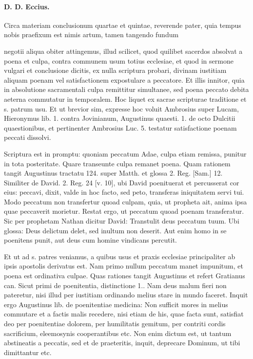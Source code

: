 \paragraph*{D. D. Eccius.}

Circa materiam conclusionum quartae et quintae, reverende pater, quia tempus nobis praefixum est nimis artum, tamen tangendo fundum

negotii aliqua obiter attingemus, illud scilicet, quod quilibet sacerdos absolvat a poena et culpa, contra communem usum totius ecclesiae, et quod in sermone vulgari et conclusione dicitis, ex nulla scriptura probari, divinam iustitiam aliquam poenam vel satisfactionem expostulare a peccatore. Et illis innitor, quia in absolutione sacramentali culpa remittitur simultanee, sed poena peccato debita aeterna commutatur in temporalem. Hoc liquet ex sacrae scripturae traditione et s. patrum usu. Et ut brevior sim, expresse hoc voluit Ambrosius super Lucam, Hieronymus lib. 1. contra Jovinianum, Augustinus quaesti. 1. de octo Dulcitii quaestionibus, et pertinenter Ambrosius Luc. 5. testatur satisfactione poenam peccati dissolvi.

Scriptura est in promptu: quoniam peccatum Adae, culpa etiam remissa, punitur in tota posteritate. Quare transeunte culpa remanet poena. Quam rationem tangit Augustinus tractatu 124. super Matth. et glossa 2. Reg. [Sam.] 12. Similiter de David. 2. Reg. 24 [v. 10], ubi David poenituerat et percusserat cor eius: peccavi, dixit, valde in hoc facto, sed peto, transferas iniquitatem servi tui. Modo peccatum non transfertur quoad culpam, quia, ut propheta ait, anima ipsa quae peccaverit morietur. Restat ergo, ut peccatum quoad poenam transferatur. Sic per prophetam Nathan dicitur David: Transtulit deus peccatum tuum. Ubi glossa: Deus delictum delet, sed inultum non deserit. Aut enim homo in se poenitens punit, aut deus cum homine vindicans percutit.

Et ut ad s. patres veniamus, a quibus usus et praxis ecclesiae principaliter ab ipsis apostolis derivatus est. Nam primo nullum peccatum manet impunitum, et poena est ordinativa culpae. Quas rationes tangit Augustinus et refert Gratianus can. Sicut primi de poenitentia, distinctione 1.. Nam deus malum fieri non pateretur, nisi illud per iustitiam ordinando melius stare in mundo faceret. Inquit ergo Augustinus lib. de poenitentiae medicina: Non sufficit mores in melius commutare et a factis malis recedere, nisi etiam de his, quae facta sunt, satisfiat deo per poenitentiae dolorem, per humilitatis gemitum, per contriti cordis sacrificium, eleemosynis cooperantibus etc. Non enim dictum est, ut tantum abstineatis a peccatis, sed et de praeteritis, inquit, deprecare Dominum, ut tibi dimittantur etc.


